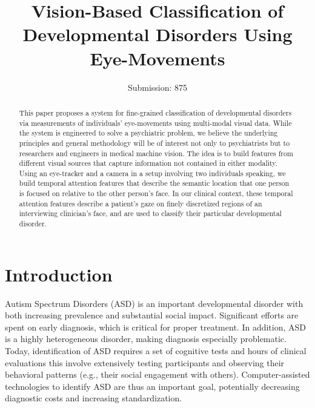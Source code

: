 \documentclass{llncs}
\begin{document}
  \title{Vision-Based Classification of Developmental Disorders Using Eye-Movements}
  \author{Submission: 875}
  \institute{}


  \maketitle

  \begin{abstract}
    This paper proposes a system for fine-grained classification of developmental disorders via measurements of individuals' eye-movements using multi-modal visual data. While the system is engineered to solve a psychiatric problem, we believe the underlying principles and general methodology will be of interest not only to psychiatrists but to researchers and engineers in medical machine vision. The idea is to build features from different visual sources that capture information not contained in either modality. Using an eye-tracker and a camera in a setup involving two individuals speaking, we build temporal attention features that describe the semantic location that one person is focused on relative to the other person's face. In our clinical context, these temporal attention features describe a patient's gaze on finely discretized regions of an interviewing clinician's face, and are used to classify their particular developmental disorder.
  \end{abstract}

  \vspace{-2.5em}
  \section{Introduction}
  \vspace{-1em}
  Autism Spectrum Disorders (ASD) is an important developmental disorder with both increasing prevalence and substantial social impact. Significant efforts are spent on early diagnosis, which is critical for proper treatment. In addition, ASD is a highly heterogeneous disorder, making diagnosis especially problematic. Today, identification of ASD requires a set of cognitive tests and hours of clinical evaluations this involve extensively testing participants and observing their behavioral patterns (e.g., their social engagement with others). Computer-assisted technologies to identify ASD are thus an important goal, potentially decreasing diagnostic costs and increasing standardization.
\end{document}
